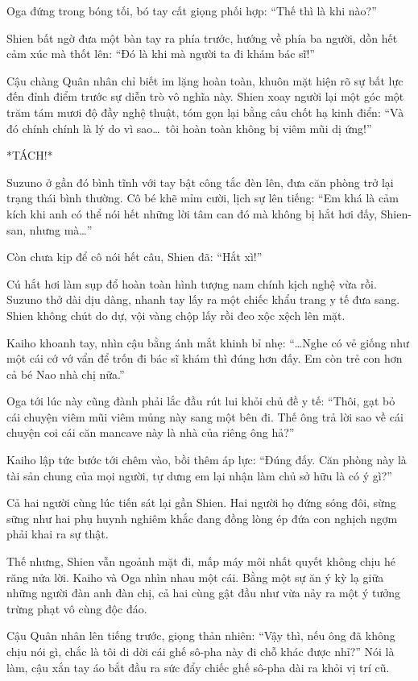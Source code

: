\documentclass[../main.tex]{subfiles}
\begin{document}
Oga đứng trong bóng tối, bó tay cất giọng phối hợp: ``Thế thì là khi nào?''

Shien bất ngờ đưa một bàn tay ra phía trước, hướng về phía ba người, dồn hết cảm xúc mà thốt lên: ``Đó là khi mà người ta đi khám bác sĩ!''

Cậu chàng Quân nhân chỉ biết im lặng hoàn toàn, khuôn mặt hiện rõ sự bất lực đến đỉnh điểm trước sự diễn trò vô nghĩa này. Shien xoay người lại một góc một trăm tám mươi độ đầy nghệ thuật, tóm gọn lại bằng câu chốt hạ kinh điển: ``Và đó chính chính là lý do vì sao\dots\ tôi hoàn toàn không bị viêm mũi dị ứng!''

*TÁCH!*

Suzuno ở gần đó bình tĩnh với tay bật công tắc đèn lên, đưa căn phòng trở lại trạng thái bình thường. Cô bé khẽ mỉm cười, lịch sự lên tiếng: ``Em khá là cảm kích khi anh có thể nói hết những lời tâm can đó mà không bị hắt hơi đấy, Shien-san, nhưng mà\dots''

Còn chưa kịp để cô nói hết câu, Shien đã: ``Hắt xì!''

Cú hắt hơi làm sụp đổ hoàn toàn hình tượng nam chính kịch nghệ vừa rồi. Suzuno thở dài dịu dàng, nhanh tay lấy ra một chiếc khẩu trang y tế đưa sang. Shien không chút do dự, vội vàng chộp lấy rồi đeo xộc xệch lên mặt.


Kaiho khoanh tay, nhìn cậu bằng ánh mắt khinh bỉ nhẹ: ``\dots Nghe có vẻ giống như một cái cớ vớ vẩn để trốn đi bác sĩ khám thì đúng hơn đấy. Em còn trẻ con hơn cả bé Nao nhà chị nữa.''

Oga tới lúc này cũng đành phải lắc đầu rút lui khỏi chủ đề y tế: ``Thôi, gạt bỏ cái chuyện viêm mũi viêm mủng này sang một bên đi. Thế ông trả lời sao về cái chuyện coi cái căn mancave này là nhà của riêng ông hả?''

Kaiho lập tức bước tới chêm vào, bồi thêm áp lực: ``Đúng đấy. Căn phòng này là tài sản chung của mọi người, tự dưng em lại nhận làm chủ sở hữu là có ý gì?''

Cả hai người cùng lúc tiến sát lại gần Shien. Hai người họ đứng sóng đôi, sừng sững như hai phụ huynh nghiêm khắc đang đồng lòng ép đứa con nghịch ngợm phải khai ra sự thật.

Thế nhưng, Shien vẫn ngoảnh mặt đi, mấp máy môi nhất quyết không chịu hé răng nửa lời. Kaiho và Oga nhìn nhau một cái. Bằng một sự ăn ý kỳ lạ giữa những người đàn anh đàn chị, cả hai cùng gật đầu như vừa nảy ra một ý tưởng trừng phạt vô cùng độc đáo.

Cậu Quân nhân lên tiếng trước, giọng thản nhiên: ``Vậy thì, nếu ông đã không chịu nói gì, chắc là tôi di dời cái ghế sô-pha này đi chỗ khác được nhỉ?'' Nói là làm, cậu xắn tay áo bắt đầu ra sức đẩy chiếc ghế sô-pha dài ra khỏi vị trí cũ.
\end{document}
